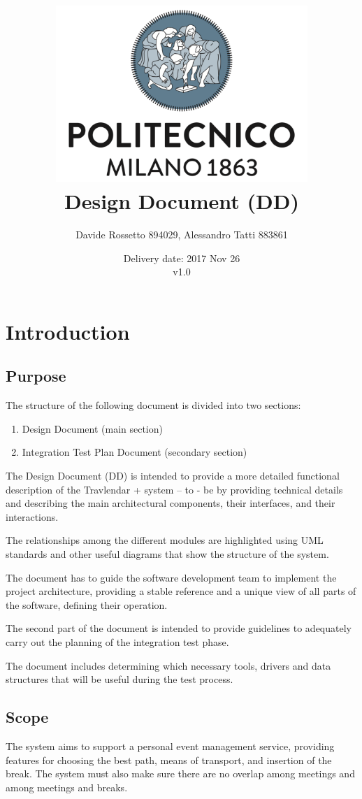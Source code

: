 \documentclass{article}
\title{ 
	\includegraphics[width=95mm]{img/PolimiLogo.png} \\
	\bigskip
	Design Document (DD)
}
\author{
	Davide Rossetto 894029, Alessandro Tatti 883861
}
\date{
	Delivery date: 2017 Nov 26\\
	\bigskip v1.0
}
\begin{document}
	
\maketitle
\newpage
\tableofcontents
\newpage
	
	
	\section{Introduction}
	

	\subsection{Purpose}
	The structure of the following document is divided into two sections:
	\begin{enumerate}
	\item Design Document (main section)
	\item Integration Test Plan Document (secondary section)
	\end{enumerate}

	\bigskip
	The Design Document (DD) is intended to provide a more detailed functional description of the Travlendar + system – to - be by providing technical details and describing the main architectural components, their interfaces, and their interactions.
	
	The relationships among the different modules are highlighted using UML standards and other useful diagrams that show the structure of the system.
	
	The document has to guide the software development team to implement the project architecture, providing a stable reference and a unique view of all parts of the software, defining their operation.

	\bigskip
	The second part of the document is intended to provide guidelines to adequately carry out the planning of the integration test phase.
	
	The document includes determining which necessary tools, drivers and data structures that will be useful during the test process.

	
	
	\subsection{Scope}
	The system aims to support a personal event management service, providing features for choosing the best path, means of transport, and insertion of the break. The system must also make sure there are no overlap among meetings and among meetings and breaks.
\end{document}
